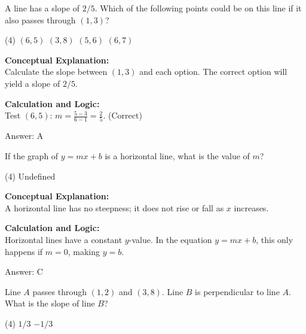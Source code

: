 \documentclass[11pt,paper=a4,answers]{exam}
\begin{document}
\begin{questions}
\vspace{20pt}

\question
A line has a slope of $2/5$. Which of the following points could be on this line if it also passes through $(1, 3)$?
\begin{tasks}(4)
    \task $(6, 5)$
    \task $(3, 8)$
    \task $(5, 6)$
    \task $(6, 7)$
\end{tasks}

\begin{solution}
\textbf{Conceptual Explanation:} \\
Calculate the slope between $(1, 3)$ and each option. The correct option will yield a slope of $2/5$.

\vspace{10pt}
\textbf{Calculation and Logic:} \\
Test $(6, 5)$: $m = \frac{5 - 3}{6 - 1} = \frac{2}{5}$. (Correct)

\vspace{15pt}
Answer: \colorbox{yellow!100}{A}
\end{solution}

\vspace{20pt}

\question
If the graph of $y = mx + b$ is a horizontal line, what is the value of $m$?
\begin{tasks}(4)
    \task Undefined
\end{tasks}

\begin{solution}
\textbf{Conceptual Explanation:} \\
A horizontal line has no steepness; it does not rise or fall as $x$ increases.

\vspace{10pt}
\textbf{Calculation and Logic:} \\
Horizontal lines have a constant $y$-value. In the equation $y = mx + b$, this only happens if $m = 0$, making $y = b$.

\vspace{15pt}
Answer: \colorbox{yellow!100}{C}
\end{solution}

\vspace{20pt}

\question
Line $A$ passes through $(1, 2)$ and $(3, 8)$. Line $B$ is perpendicular to line $A$. What is the slope of line $B$?
\begin{tasks}(4)
    \task $1/3$
    \task $-1/3$
\end{tasks}


\end{questions}
\end{document}
